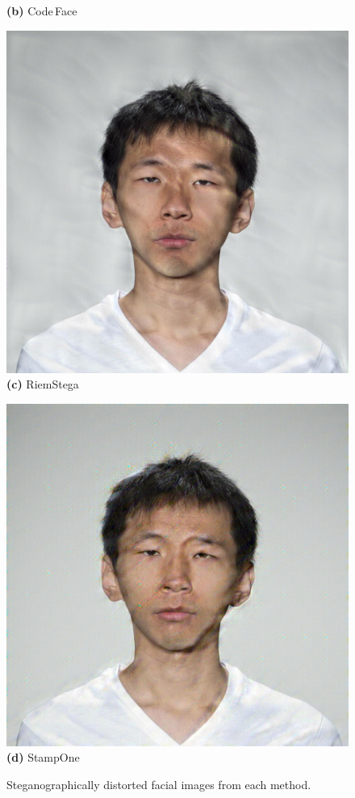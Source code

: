 \begin{figure}[ht]
\begin{minipage}[t]{0.2\textwidth}
        \textbf{(b)} Code\,Face
    \end{minipage}
    \hfill
    \begin{minipage}[t]{0.2\textwidth}
        \centering
        \includegraphics[width=\textwidth]{images/005_RiemStega_1.4.jpg}\\
        \textbf{(c)} RiemStega
    \end{minipage}
    \hfill
    \begin{minipage}[t]{0.2\textwidth}
        \centering
        \includegraphics[width=\textwidth]{images/005_StampOne_1.4.jpg}\\
        \textbf{(d)} StampOne
    \end{minipage}
    \caption{Steganographically distorted facial images from each method.}\label{fig:steganography}
\end{figure}


